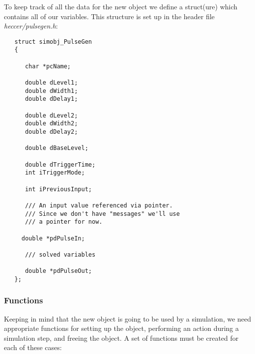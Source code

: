 \documentclass[12pt]{article}
\begin{document}
To keep track of all the data for the new object we define a struct(ure) which contains all of our variables. This structure is set up in the header file {\it heccer/pulsegen.h}:
\begin{verbatim}
   struct simobj_PulseGen
   {
   
      char *pcName;

      double dLevel1;
      double dWidth1;
      double dDelay1;

      double dLevel2;
      double dWidth2;
      double dDelay2;

      double dBaseLevel;

      double dTriggerTime;
      int iTriggerMode;
  
      int iPreviousInput;

      /// An input value referenced via pointer. 
      /// Since we don't have "messages" we'll use 
      /// a pointer for now.
  
     double *pdPulseIn;

      /// solved variables

      double *pdPulseOut;
   };
\end{verbatim}

\subsubsection*{Functions}

Keeping in mind that the new object is going to be used by a simulation, we need appropriate functions for setting up the object, performing an action during a simulation step, and freeing the object. A set of functions must be created for each of these cases:
\end{document}
